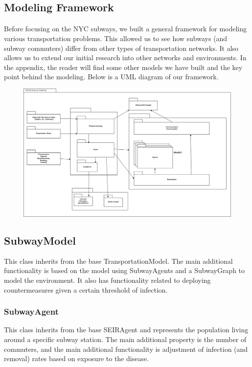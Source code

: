 \documentclass[12pt, a4, epsf] {article}
\theoremstyle{plain}
\theoremstyle{definition}
\begin{document}
\subsection{Modeling Framework}
\paragraph{}
Before focusing on the NYC subways, we built a general framework for modeling various transportation problems. This allowed us to see how subways (and subway commuters) differ from other types of transportation networks. It also allows us to extend our initial research into other networks and environments. In the appendix, the reader will find some other models we have built and the key point behind the modeling. Below is a UML diagram of our framework.
\begin{figure}[htbp]
\includegraphics[width = 1.0\textwidth]{Scratch_Visuals/covid_subway.png}
\end{figure}
\subsection{SubwayModel}
This class inherits from the base TransportationModel. The main additional functionality is based on the model using SubwayAgents and a SubwayGraph to model the environment. It also has functionality related to deploying countermeasures given a certain threshold of infection. 
\subsubsection{SubwayAgent}
This class inherits from the base SEIRAgent and represents the population living around a specific subway station. The main additional property is the number of commuters, and the main additional functionality is adjustment of infection (and removal) rates based on exposure to the disease.
\end{document}
